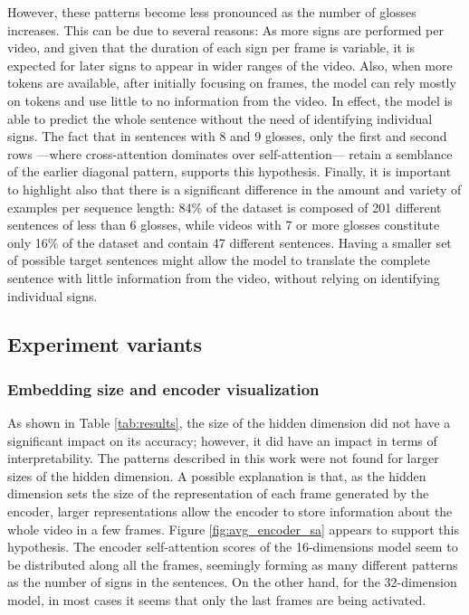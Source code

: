 However, these patterns become less pronounced as the number of glosses increases. This can be due to several reasons: As more signs are performed per video, and given that the duration of each sign per frame is variable, it is expected for later signs to appear in wider ranges of the video. Also, when more tokens are available, after initially focusing on frames, the model can rely mostly on tokens and use little to no information from the video. In effect, the model is able to predict the whole sentence without the need of identifying individual signs. The fact that in sentences with 8 and 9 glosses, only the first and second rows —where cross-attention dominates over self-attention— retain a semblance of the earlier diagonal pattern, supports   this hypothesis. Finally, it is important to highlight also that there is a significant difference in the amount and variety of examples per sequence length: 84\% of the dataset is composed of 201 different sentences of less than 6 glosses, while videos with 7 or more glosses constitute only 16\% of the dataset and contain 47 different sentences. Having a smaller set of possible target sentences might allow the model to translate the complete sentence with little information from the video, without relying on identifying individual signs.

\subsection{Experiment variants}\label{subsec:variations}

\subsubsection{Embedding size and encoder visualization}

As shown in Table \ref{tab:results}, the size of the hidden dimension did not have a significant impact on its accuracy; however, it did have an impact in terms of interpretability. The patterns described in this work were not found for larger sizes of the hidden dimension. A possible explanation is that, as the hidden dimension sets the size of the representation of each frame generated by the encoder, larger representations allow the encoder to store information about the whole video in a few frames. Figure \ref{fig:avg_encoder_sa} appears to support this hypothesis. The encoder self-attention scores of the 16-dimensions model seem to be distributed along all the frames, seemingly forming as many different patterns as the number of signs in the sentences. On the other hand, for the 32-dimension model, in most cases it seems that only the last frames are being activated.

